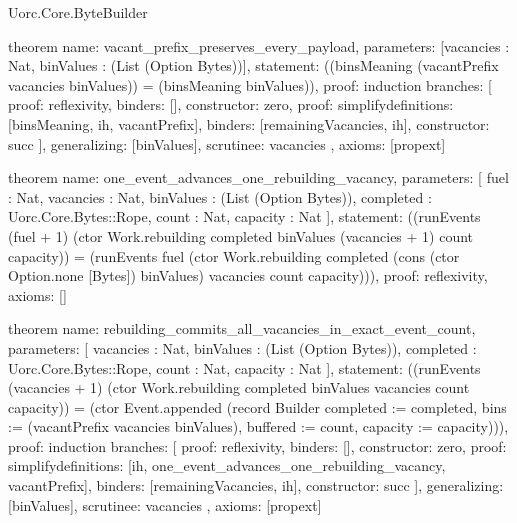 \begin{lexlean}{Uorc.Core.ByteBuilder}
\begin{semanticmodule}
theorem{
  name: vacant_prefix_preserves_every_payload,
  parameters: [vacancies : Nat, binValues : (List (Option Bytes))],
  statement: ((binsMeaning (vacantPrefix vacancies binValues)) = (binsMeaning binValues)),
  proof: induction{
    branches: [
      {proof: reflexivity{}, binders: [], constructor: zero},
      {
        proof: simplify{definitions: [binsMeaning, ih, vacantPrefix]},
        binders: [remainingVacancies, ih],
        constructor: succ
      }
    ],
    generalizing: [binValues],
    scrutinee: vacancies
  },
  axioms: [propext]
}

theorem{
  name: one_event_advances_one_rebuilding_vacancy,
  parameters: [
    fuel : Nat,
    vacancies : Nat,
    binValues : (List (Option Bytes)),
    completed : Uorc.Core.Bytes::Rope,
    count : Nat,
    capacity : Nat
  ],
  statement: ((runEvents (fuel + 1) (ctor Work.rebuilding completed binValues (vacancies + 1) count capacity)) = (runEvents fuel (ctor Work.rebuilding completed (cons (ctor Option.none [Bytes]) binValues) vacancies count capacity))),
  proof: reflexivity{},
  axioms: []
}

theorem{
  name: rebuilding_commits_all_vacancies_in_exact_event_count,
  parameters: [
    vacancies : Nat,
    binValues : (List (Option Bytes)),
    completed : Uorc.Core.Bytes::Rope,
    count : Nat,
    capacity : Nat
  ],
  statement: ((runEvents (vacancies + 1) (ctor Work.rebuilding completed binValues vacancies count capacity)) = (ctor Event.appended (record Builder {completed := completed, bins := (vacantPrefix vacancies binValues), buffered := count, capacity := capacity}))),
  proof: induction{
    branches: [
      {proof: reflexivity{}, binders: [], constructor: zero},
      {
        proof: simplify{definitions: [ih, one_event_advances_one_rebuilding_vacancy, vacantPrefix]},
        binders: [remainingVacancies, ih],
        constructor: succ
      }
    ],
    generalizing: [binValues],
    scrutinee: vacancies
  },
  axioms: [propext]
}
\end{semanticmodule}
\end{lexlean}
